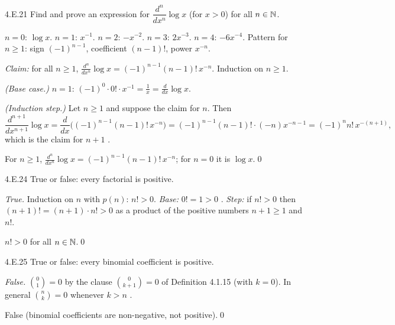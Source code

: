 \begin{bookex}[recommended]{4.E.21}
Find and prove an expression for $\dfrac{d^n}{dx^n}\log x$ (for $x>0$) for all $n\in\mathbb{N}$.
\solution
\begin{steps}
\item $n=0$: $\log x$. $n=1$: $x^{-1}$. $n=2$: $-x^{-2}$. $n=3$: $2x^{-3}$. $n=4$: $-6x^{-4}$. Pattern for $n\ge1$: sign $(-1)^{n-1}$, coefficient $(n-1)!$, power $x^{-n}$.
\item \emph{Claim:} for all $n\ge1$, $\frac{d^n}{dx^n}\log x=(-1)^{n-1}(n-1)!\,x^{-n}$. Induction on $n\ge1$.
\item \emph{(Base case.)} $n=1$: $(-1)^0\cdot0!\cdot x^{-1}=\frac1x=\frac d{dx}\log x$.
\item \emph{(Induction step.)} Let $n\ge1$ and suppose the claim for $n$. Then
\[
\frac{d^{n+1}}{dx^{n+1}}\log x=\frac d{dx}\big((-1)^{n-1}(n-1)!\,x^{-n}\big)=(-1)^{n-1}(n-1)!\cdot(-n)x^{-n-1}=(-1)^nn!\,x^{-(n+1)},
\]
which is the claim for $n+1$ .
\end{steps}
\conclusion For $n\ge1$, $\frac{d^n}{dx^n}\log x=(-1)^{n-1}(n-1)!\,x^{-n}$; for $n=0$ it is $\log x$.\qed
\end{bookex}

\begin{bookex}[recommended]{4.E.24}
True or false: every factorial is positive.
\solution
\begin{steps}
\item \emph{True.} Induction on $n$ with $p(n)$: $n!>0$. \emph{Base:} $0!=1>0$ . \emph{Step:} if $n!>0$ then $(n+1)!=(n+1)\cdot n!>0$ as a product of the positive numbers $n+1\ge1$ and $n!$.
\end{steps}
\conclusion $n!>0$ for all $n\in\mathbb{N}$.\qed
\end{bookex}

\begin{bookex}[essential]{4.E.25}
True or false: every binomial coefficient is positive.
\solution
\begin{steps}
\item \emph{False.} $\binom01=0$ by the clause $\binom0{k+1}=0$ of Definition 4.1.15 (with $k=0$). In general $\binom nk=0$ whenever $k>n$ .
\end{steps}
\conclusion False (binomial coefficients are non-negative, not positive).\qed
\end{bookex}

